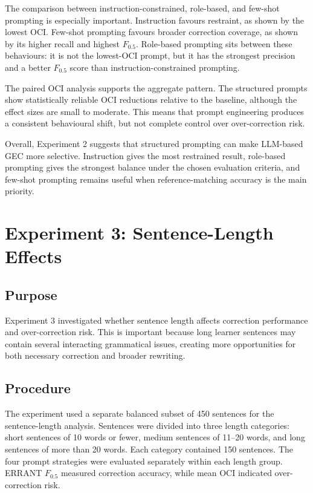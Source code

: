 The comparison between instruction-constrained, role-based, and few-shot prompting is especially important. Instruction favours restraint, as shown by the lowest OCI. Few-shot prompting favours broader correction coverage, as shown by its higher recall and highest $F_{0.5}$. Role-based prompting sits between these behaviours: it is not the lowest-OCI prompt, but it has the strongest precision and a better $F_{0.5}$ score than instruction-constrained prompting.

The paired OCI analysis supports the aggregate pattern. The structured prompts show statistically reliable OCI reductions relative to the baseline, although the effect sizes are small to moderate. This means that prompt engineering produces a consistent behavioural shift, but not complete control over over-correction risk.

Overall, Experiment 2 suggests that structured prompting can make LLM-based GEC more selective. Instruction gives the most restrained result, role-based prompting gives the strongest balance under the chosen evaluation criteria, and few-shot prompting remains useful when reference-matching accuracy is the main priority.

\section{Experiment 3: Sentence-Length Effects}

\subsection{Purpose}

Experiment 3 investigated whether sentence length affects correction performance and over-correction risk. This is important because long learner sentences may contain several interacting grammatical issues, creating more opportunities for both necessary correction and broader rewriting.

\subsection{Procedure}

The experiment used a separate balanced subset of 450 sentences for the sentence-length analysis. Sentences were divided into three length categories: short sentences of 10 words or fewer, medium sentences of 11--20 words, and long sentences of more than 20 words. Each category contained 150 sentences. The four prompt strategies were evaluated separately within each length group. ERRANT $F_{0.5}$ measured correction accuracy, while mean OCI indicated over-correction risk.


